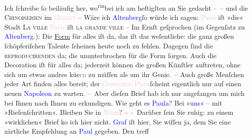            \pstart
           Ich ſchreibe ſo beiläufig her, wo\substVorne{}\textsuperscript{rin}\substDazwischen{}bei\substHinten{} ich am
               heftigſten an Sie gedacht – {\pb}– und die \textsc{Chinoiserien} im \textcolor{pink}{\textsc{Guimet}}{}\ledrightnote{\textcolor{pink}{Museum Guimet}} –\pend
           \pstart
           Wäre ich \textcolor{blue}{Altenberg}{}\ledrightnote{\textcolor{blue}{Peter Altenberg}}{ }ſo würde ich sagen:\pend
           \pstart
           \textcolor{pink}{Paris}{}\ledrightnote{\textcolor{pink}{Paris}} iſt »die« Stadt {\dotsfive}{ }\textsc{La ville}{ }{\dotsseven}\pend
           \pstart
           \textcolor{pink}{Paris}{}\ledrightnote{\textcolor{pink}{Paris}} iſt \textsc{la grande ville}{ }{\dotsfour}\pend
           \pstart
           \numberlinefalse{}–\numberlinetrue{}\pend
           \pstart
           Im Ernſt geſprochen (im Gegenſatz zu \textcolor{blue}{Altenberg}{}\ledrightnote{\textcolor{blue}{Peter Altenberg}}.):
               Die \uline{Form} für alles iſt da, \introOben{}das
                  iſt\introOben{} das weſentliche: die ganz {\pb}großen
                  \introOben{}ſchöpferiſchen\introOben{} Talente ſcheinen heute noch zu fehlen.
               Dagegen ſind die \textsc{reproducirenden} da; die ununterbrochen für
               die Form ſorgen. Auch die Decoration iſt für alles da; jederzeit können die großen
               Künſtler auftreten, ohne sich um etwas andres kü{\geminationm}e\textcolor{gray}{rn} zu
               müſſen als um ihr Genie. – Auch große Menſchen {\pb}jeder Art finden alles bereit; der \textcolor{pink}{\textsc{Concorde}-Platz}{}\ledrightnote{\textcolor{pink}{Place de la Concorde}}{ }ſcheint
               eigentlich nur auf einen neuen \textcolor{blue}{Napoleon}{} zu warten.\pend
           \pstart
           – Aber dieſen Brief hab ich nur angefangen um mich bei Ihnen nach Ihnen zu
               erkundigen. Wie geht es \textcolor{blue}{Paula}{}\ledrightnote{\textcolor{blue}{Paula Beer-Hofmann}}? Bei »\textcolor{blue}{uns}{}« – mit »Rieſen{\pb}ſchritten«.\pend
           \pstart
           Bleiben Sie in \textcolor{pink}{Wien}{}\ledrightnote{\textcolor{pink}{Wien}}? – \pend
           \pstart
           – Darüber ſein Sie ruhig: zu einem »wirklichen« Brief ko{\geminationm} ich hier nicht.\pend
           \pstart
           \textcolor{blue}{Graf}{}\ledrightnote{\textcolor{blue}{Max Graf}} iſt hier, Sie wiſſen ja, dem Sie eine
               zärtliche Empfehlung an \textcolor{blue}{Paul}{}\ledrightnote{\textcolor{blue}{Paul Goldmann}} gegeben. Den treff
